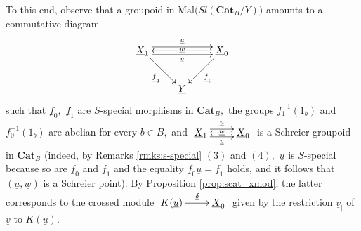 \documentclass[11pt]{amsart}
\theoremstyle{plain}
\theoremstyle{definition}
\theoremstyle{remark}
\newcommand{\un}{\underline}
\begin{document}
To this end, observe that a groupoid in $\mathrm{Mal}\big(Sl(\mathbf{Cat}_B/\un{Y})\big)$ amounts to a commutative diagram
\begin{equation}
\label{eqn:1-grpd-special}
\begin{aligned}
\xymatrix{
{\un{X}_1} \ar[rd]_-{\un{f}_1} \ar@<.9ex>[rr]^-{\un{u}} \ar@<-.9ex>[rr]_-{\un{v}} &\ &{\un{X}_0} \ar[ll]|-{\un{w}} \ar[ld]^-{\un{f}_0} \\
&{\un{Y}}
}
\end{aligned}
\end{equation}
such that $\un{f}_0,$ $\un{f}_1$ are $S$-special morphisms in $\mathbf{Cat}_B,$ the groups $f_1^{-1}(1_b)$ and $f_0^{-1}(1_b)$ are abelian for every $b\in B,$ and $\xymatrix{ {\un{X}_1} \ar@<.9ex>[r]^-{\un{u}} \ar@<-.9ex>[r]_-{\un{v}} &{\un{X}_0} \ar[l]|-{\un{w}}}$ is a Schreier groupoid in $\mathbf{Cat}_B$ (indeed, by Remarks \ref{rmks:s-special} $(3)$ and $(4),$ $\un{u}$ is $S$-special because so are $\un{f}_0$ and $\un{f}_1$ and the equality $\un{f}_0\un{u}=\un{f}_1$ holds, and it follows that $(\un{u},\un{w})$ is a Schreier point). By Proposition \ref{prop:scat_xmod}, the latter corresponds to the crossed module $\xymatrix{ {K(\un{u})} \ar[r]^-{\un{\delta}} &{\un{X}_0} }$ given by the restriction $\un{v}_|$ of $\un{v}$ to $K(\un{u}).$
\end{document}
